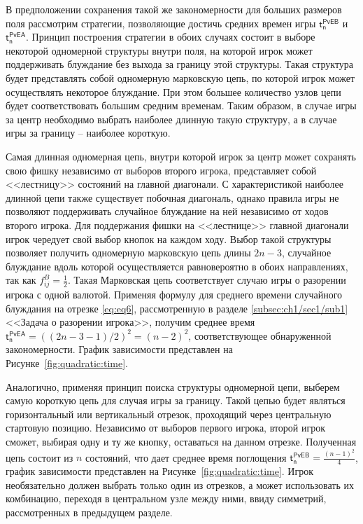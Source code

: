 В предположении сохранения такой же закономерности для больших размеров поля рассмотрим стратегии, позволяющие достичь средних времен игры $\boldsymbol{\mathsf{t_n^{PvE B}}}$ и $\boldsymbol{\mathsf{t_n^{PvE A}}}$. Принцип построения стратегии в обоих случаях состоит в выборе некоторой одномерной структуры внутри поля, на которой игрок может поддерживать блуждание без выхода за границу этой структуры. Такая структура будет представлять собой одномерную марковскую цепь, по которой игрок может осуществлять некоторое блуждание. При этом большее количество узлов цепи будет соответствовать большим средним временам. Таким образом, в случае игры за центр необходимо выбрать наиболее длинную такую структуру, а в случае игры за границу -- наиболее короткую.

Самая длинная одномерная цепь, внутри которой игрок за центр может сохранять свою фишку независимо от выборов второго игрока, представляет собой <<лестницу>> состояний на главной диагонали. С характеристикой наиболее длинной цепи также существует побочная диагональ, однако правила игры не позволяют поддерживать случайное блуждание на ней независимо от ходов второго игрока. Для поддержания фишки на <<лестнице>> главной диагонали игрок чередует свой выбор кнопок на каждом ходу. Выбор такой структуры позволяет получить одномерную марковскую цепь длины $2n-3$, случайное блуждание вдоль которой осуществляется равновероятно в обоих направлениях, так как $f_{ij}^B=\frac{1}{2}$. Такая Марковская цепь соответствует случаю игры о разорении игрока с одной валютой. Применяя формулу для среднего времени случайного блуждания на отрезке \eqref{eq:eq6}, рассмотренную в разделе \cref{subsec:ch1/sec1/sub1} <<Задача о разорении игрока>>, получим среднее время $\boldsymbol{\mathsf{t_n^{PvE A}}} = ((2n-3-1)/2)^2 = (n-2)^2$, соответствующее обнаруженной закономерности. График зависимости представлен на Рисунке~\cref{fig:quadratic:time}.

Аналогично, применяя принцип поиска структуры одномерной цепи, выберем самую короткую цепь для случая игры за границу. Такой цепью будет являться горизонтальный или вертикальный отрезок, проходящий через центральную стартовую позицию. Независимо от выборов первого игрока, второй игрок сможет, выбирая одну и ту же кнопку, оставаться на данном отрезке. Полученная цепь состоит из $n$ состояний, что дает среднее время поглощения $\boldsymbol{\mathsf{t_n^{PvE B}}} = \frac{(n-1)^2}{4}$, график зависимости представлен на Рисунке~\cref{fig:quadratic:time}. Игрок необязательно должен выбрать только один из отрезков, а может использовать их комбинацию, переходя в центральном узле между ними, ввиду симметрий, рассмотренных в предыдущем разделе. 

